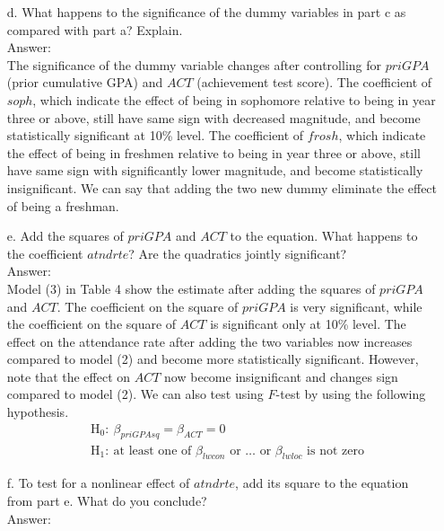 \documentclass[10pt]{article}
\begin{document}
\begin{enumerate}
\item[d.] What happens to the significance of the dummy variables in part c as compared with part a? Explain.
\\ Answer:\\
The significance of the dummy variable changes after controlling for $priGPA$ (prior cumulative GPA) and $ACT$ (achievement test score). The coefficient of $soph$, which indicate the effect of being in sophomore relative to being in year three or above, still have same sign with decreased magnitude, and become statistically significant at 10\% level. The coefficient of $frosh$, which indicate the effect of being in freshmen relative to being in year three or above, still have same sign with significantly lower magnitude, and become statistically insignificant. We can say that adding the two new dummy eliminate the effect of being a freshman.

\item[e.] Add the squares of $priGPA$ and $ACT$ to the equation. What happens to the coefficient $atndrte$? Are the quadratics jointly significant?
\\ Answer:\\
Model (3) in Table 4 show the estimate after adding the squares of $priGPA$ and $ACT$. The coefficient on the square of $priGPA$ is very significant, while the coefficient on the square of $ACT$ is significant only at 10\% level. The effect on the attendance rate after adding the two variables now increases compared to model (2) and become more statistically significant. However, note that the effect on $ACT$ now become insignificant and changes sign compared to model (2). 
We can also test using $F$-test by using the following hypothesis.
\begin{align*}
    &\text{H}_0:\ \beta_{priGPAsq}=\beta_{ACT}=0\\
    &\text{H}_1:\ \text{at least one of }\beta_{lwcon}\text{ or }\ldots\text{ or }\beta_{lwloc} \text{ is not zero}
\end{align*}

\item[f.] To test for a nonlinear effect of $atndrte$, add its square to the equation from part e. What do you conclude? 
\\ Answer:\\
\end{enumerate}
\end{document}
